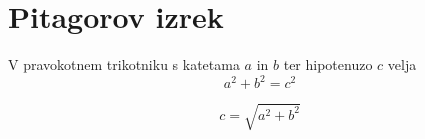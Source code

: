 \documentclass{article}
\begin{document}
\section*{Pitagorov izrek}
V pravokotnem trikotniku s katetama \(a\) in \(b\) ter hipotenuzo \(c\) velja
\[ a^2 + b^2 = c^2 \]
\begin{center} 
    \[c = \sqrt{ a^2 + b^2} \]
\end{center}
\end{document}
